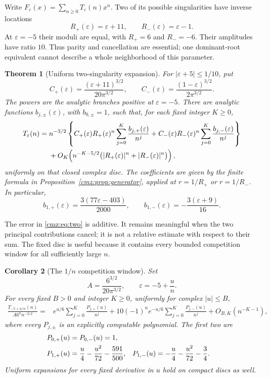 \documentclass[11pt,letterpaper]{article}
\numberwithin{equation}{section}
\newtheorem{theorem}{Theorem}[section]
\newtheorem{corollary}[theorem]{Corollary}
\theoremstyle{definition}\newtheorem{definition}[theorem]{Definition}
\theoremstyle{remark}\newtheorem{remark}[theorem]{Remark}
\newcommand{\eps}{\varepsilon}
\begin{document}
Write $F_\eps(x)=\sum_{n\geq0}T_\eps(n)x^n$. Two of its possible singularities have inverse locations
\[
R_+(\eps)=\eps+11,\qquad R_-(\eps)=\eps-1.
\]
At $\eps=-5$ their moduli are equal, with $R_+=6$ and $R_-=-6$. Their amplitudes have ratio $10$. Thus parity and cancellation are essential; one dominant-root equivalent cannot describe a whole neighborhood of this parameter.

\begin{theorem}[Uniform two-singularity expansion]
\label{cmz:thm:uniform}
For $|\eps+5|\leq1/10$, put
\begin{equation}
C_+(\eps)=\frac{(\eps+11)^{3/2}}{20\pi^{3/2}},\qquad
C_-(\eps)=\frac{(1-\eps)^{3/2}}{2\pi^{3/2}}.
\label{cmz:eq:amps}
\end{equation}
The powers are the analytic branches positive at $\eps=-5$. There are analytic functions $b_{j,\pm}(\eps)$, with $b_{0,\pm}=1$, such that, for each fixed integer $K\geq0$,
\begin{align}
T_\eps(n)={}&n^{-3/2}\left\{C_+(\eps)R_+(\eps)^n
                  \sum_{j=0}^K\frac{b_{j,+}(\eps)}{n^j}
       +C_-(\eps)R_-(\eps)^n
                  \sum_{j=0}^K\frac{b_{j,-}(\eps)}{n^j}\right\}\notag\\
&+O_K\!\left(n^{-K-5/2}
      \bigl(|R_+(\eps)|^n+|R_-(\eps)|^n\bigr)\right),
\label{cmz:eq:two}
\end{align}
uniformly on that closed complex disc. The coefficients are given by the finite formula in Proposition~\ref{cmz:prop:generator}, applied at $r=1/R_+$ or $r=1/R_-$. In particular,
\begin{equation}
b_{1,+}(\eps)=\frac{3(77\eps-403)}{2000},\qquad
b_{1,-}(\eps)=-\frac{3(\eps+9)}{16}.
\label{cmz:eq:twob1}
\end{equation}
\end{theorem}

The error in \eqref{cmz:eq:two} is additive. It remains meaningful when the two principal contributions cancel; it is not a relative estimate with respect to their sum. The fixed disc is useful because it contains every bounded competition window for all sufficiently large $n$.

\begin{corollary}[The $1/n$ competition window]
\label{cmz:cor:window}
Set
\[
A=\frac{6^{3/2}}{20\pi^{3/2}},\qquad \eps=-5+\frac{u}{n}.
\]
For every fixed $B>0$ and integer $K\geq0$, uniformly for complex $|u|\leq B$,
\begin{align}
\frac{T_{-5+u/n}(n)}{A6^n n^{-3/2}}
={}&e^{u/6}\sum_{j=0}^K\frac{P_{j,+}(u)}{n^j}
+10(-1)^n e^{-u/6}\sum_{j=0}^K\frac{P_{j,-}(u)}{n^j}
+O_{B,K}(n^{-K-1}),
\label{cmz:eq:window}
\end{align}
where every $P_{j,\pm}$ is an explicitly computable polynomial. The first two are
\begin{align}
P_{0,+}(u)&=P_{0,-}(u)=1,\notag\\
P_{1,+}(u)&=\frac u4-\frac{u^2}{72}-\frac{591}{500},
& P_{1,-}(u)&=-\frac u4-\frac{u^2}{72}-\frac34.
\label{cmz:eq:P1}
\end{align}
Uniform expansions for every fixed derivative in $u$ hold on compact discs as well.
\end{corollary}
\end{document}

